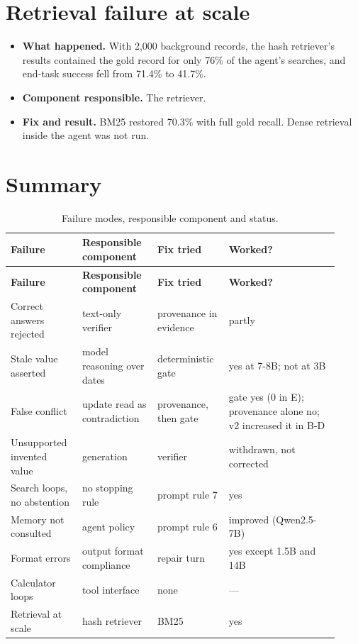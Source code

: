 \documentclass[10.5pt,a4paper,oneside]{report}
\begin{document}
\section{Retrieval failure at scale}
\begin{itemize}
\item \textbf{What happened.} With 2,000 background records, the hash retriever's results contained the gold record for only 76\% of the agent's searches, and end-task success fell from 71.4\% to 41.7\%.
\item \textbf{Component responsible.} The retriever.
\item \textbf{Fix and result.} BM25 restored 70.3\% with full gold recall. Dense retrieval inside the agent was not run.
\end{itemize}
\section{Summary}
\begingroup\small\setlength{\tabcolsep}{4pt}\renewcommand{\arraystretch}{1.18}
\begin{longtable}{>{\raggedright\arraybackslash}p{0.194\linewidth}>{\raggedright\arraybackslash}p{0.214\linewidth}>{\raggedright\arraybackslash}p{0.195\linewidth}>{\raggedright\arraybackslash}p{0.317\linewidth}}
\caption{Failure modes, responsible component and status.}\\
\toprule
\textbf{Failure} & \textbf{Responsible component} & \textbf{Fix tried} & \textbf{Worked?} \\
\midrule
\endfirsthead
\toprule
\textbf{Failure} & \textbf{Responsible component} & \textbf{Fix tried} & \textbf{Worked?} \\
\midrule
\endhead
\bottomrule
\endlastfoot
Correct answers rejected & text-only verifier & provenance in evidence & partly \\
Stale value asserted & model reasoning over dates & deterministic gate & yes at 7-8B; not at 3B \\
False conflict & update read as contradiction & provenance, then gate & gate yes (0 in E); provenance alone no; v2 increased it in B-D \\
Unsupported invented value & generation & verifier & withdrawn, not corrected \\
Search loops, no abstention & no stopping rule & prompt rule 7 & yes \\
Memory not consulted & agent policy & prompt rule 6 & improved (Qwen2.5-7B) \\
Format errors & output format compliance & repair turn & yes except 1.5B and 14B \\
Calculator loops & tool interface & none & — \\
Retrieval at scale & hash retriever & BM25 & yes \\
\end{longtable}
\endgroup
\end{document}
